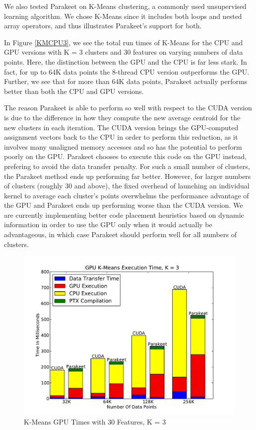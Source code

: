 \documentclass[10pt,twocolumn]{article}
\begin{document}
We also tested Parakeet on K-Means clustering, a commonly used unsupervised learning algorithm.  We chose K-Means since it includes both loops and nested array operators, and thus illustrates Parakeet's support for both.

In Figure \ref{KMCPU3}, we see the total run times of K-Means for the CPU and GPU versions with K = 3 clusters and 30 features on varying numbers of data points.  Here, the distinction between the GPU and the CPU is far less stark.  In fact, for up to 64K data points the 8-thread CPU version outperforms the GPU.  Further, we see that for more than 64K data points, Parakeet actually performs better than both the CPU and GPU versions.

The reason Parakeet is able to perform so well with respect to the CUDA version is due to the difference in how they compute the new average centroid for the new clusters in each iteration.  The CUDA version brings the GPU-computed assignment vectors back to the CPU in order to perform this reduction, as it involves many unaligned memory accesses and so has the potential to perform poorly on the GPU.  Parakeet chooses to execute this code on the GPU instead, prefering to avoid the data transfer penalty.  For such a small number of clusters, the Parakeet method ends up performing far better.  However, for larger numbers of clusters (roughly 30 and above), the fixed overhead of launching an individual kernel to average each cluster's points overwhelms the performance advantage of the GPU and Parakeet ends up performing worse than the CUDA version.  We are currently implementing better code placement heuristics based on dynamic information in order to use the GPU only when it would actually be advantageous, in which case Parakeet should perform well for all numbers of clusters.

\begin{figure}
\includegraphics[scale=0.4]{KMGPU.pdf}
\caption{K-Means GPU Times with 30 Features, K = 3}
\label{KMGPU}
\end{figure}
\end{document}

